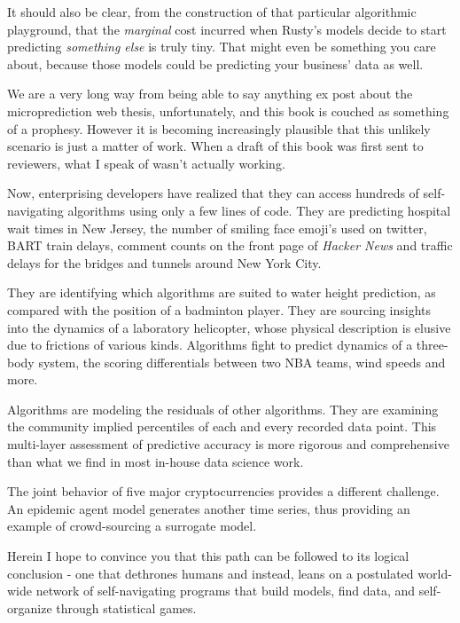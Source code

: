It should also be clear, from the construction of that particular algorithmic playground, that the {\em marginal} cost incurred when Rusty's models decide to start predicting {\em something else} is truly tiny. That might even be something you care about, because those models could be predicting your business' data as well.

We are a very long way from being able to say anything ex post about the microprediction web thesis, unfortunately, and this book is couched as something of a prophesy. However it is becoming increasingly plausible that this unlikely scenario is just a matter of work. When a draft of this book was first sent to reviewers, what I speak of wasn't actually working. 

Now, enterprising developers have realized that they can access hundreds of self-navigating algorithms using only a few lines of code. They are predicting hospital wait times in New Jersey, the number of smiling face emoji's used on twitter, BART train delays, comment counts on the front page of {\em Hacker News} and traffic delays for the bridges and tunnels around New York City. 

They are identifying which algorithms are suited to water height prediction, as compared with the position of a badminton player. They are sourcing insights into the dynamics of a laboratory helicopter, whose physical description is elusive due to frictions of various kinds. Algorithms fight to predict dynamics of a three-body system, the scoring differentials between two NBA teams, wind speeds and more. 

Algorithms are modeling the residuals of other algorithms. They are examining the community implied percentiles of each and every recorded data point. This multi-layer assessment of predictive accuracy is more rigorous and comprehensive than what we find in most in-house data science work.


The joint behavior of five major cryptocurrencies provides a different challenge. An epidemic agent model generates another time series, thus providing an example of crowd-sourcing a surrogate model. 

Herein I hope to convince you that this path can be followed to its logical conclusion - one that dethrones humans and instead, leans on a postulated world-wide network of self-navigating programs that build models, find data, and self-organize through statistical games. 

